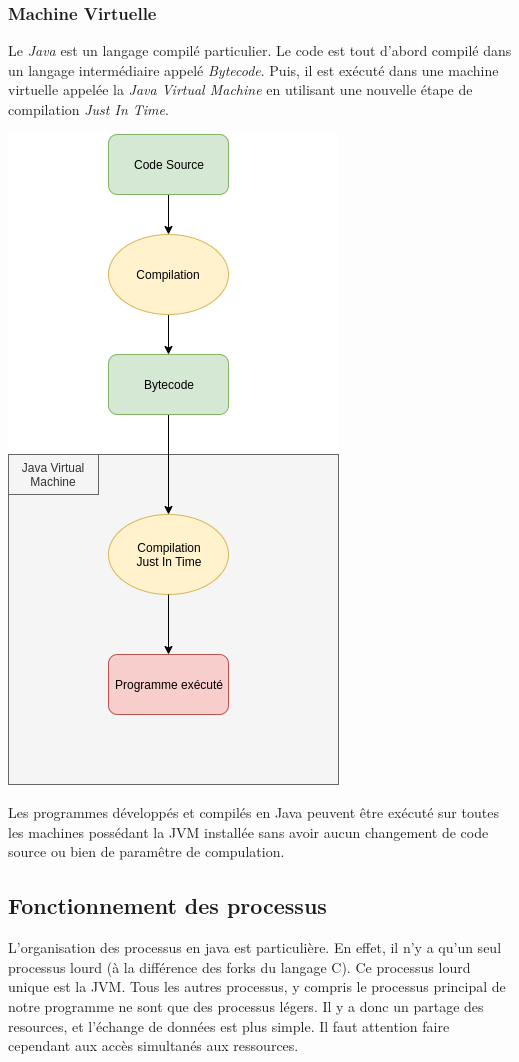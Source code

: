 \documentclass[a4paper, 11pt]{report}
\begin{document}
		\subsubsection{Machine Virtuelle}
			Le \emph{Java} est un langage compilé particulier. Le code est tout d'abord compilé dans un langage intermédiaire appelé \emph{Bytecode}. 
			Puis, il est exécuté dans une machine virtuelle appelée la \emph {Java Virtual Machine} en utilisant une nouvelle étape de compilation \emph {Just In Time}.
			\par
			\begin{center}
				\includegraphics[scale=0.5]{java_compilation.png}
			\end{center}
			Les programmes développés et compilés en Java peuvent être exécuté sur toutes les machines possédant la JVM installée sans avoir aucun changement de code source ou bien de paramêtre de compulation.
	\subsection{Fonctionnement des processus}
		L'organisation des processus en java est particulière. En effet, il n'y a qu'un seul processus lourd (à la différence des forks du langage C).
		Ce processus lourd unique est la JVM. Tous les autres processus, y compris le processus principal de notre programme ne sont que des processus légers.
		Il y a donc un partage des resources, et l'échange de données est plus simple. Il faut attention faire cependant aux accès simultanés aux ressources.
\end{document}
